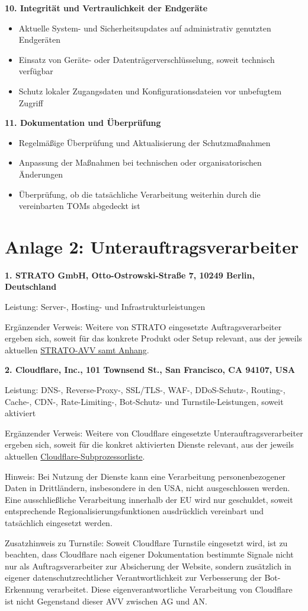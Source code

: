 \documentclass[11pt,a4paper]{article}
\begin{document}
\textbf{10. Integrität und Vertraulichkeit der Endgeräte}
\begin{itemize}
  \item Aktuelle System- und Sicherheitsupdates auf administrativ genutzten Endgeräten
  \item Einsatz von Geräte- oder Datenträgerverschlüsselung, soweit technisch verfügbar
  \item Schutz lokaler Zugangsdaten und Konfigurationsdateien vor unbefugtem Zugriff
\end{itemize}

\textbf{11. Dokumentation und Überprüfung}
\begin{itemize}
  \item Regelmäßige Überprüfung und Aktualisierung der Schutzmaßnahmen
  \item Anpassung der Maßnahmen bei technischen oder organisatorischen Änderungen
  \item Überprüfung, ob die tatsächliche Verarbeitung weiterhin durch die vereinbarten TOMs abgedeckt ist
\end{itemize}

\section*{Anlage 2: Unterauftragsverarbeiter}
\textbf{1. STRATO GmbH, Otto-Ostrowski-Straße 7, 10249 Berlin, Deutschland}\par
Leistung: Server-, Hosting- und Infrastrukturleistungen\par
Ergänzender Verweis: Weitere von STRATO eingesetzte Auftragsverarbeiter ergeben sich, soweit für das konkrete Produkt oder Setup relevant, aus der jeweils aktuellen \href{https://www.strato.de/agb/avv/}{STRATO-AVV samt Anhang}.

\textbf{2. Cloudflare, Inc., 101 Townsend St., San Francisco, CA 94107, USA}\par
Leistung: DNS-, Reverse-Proxy-, SSL/TLS-, WAF-, DDoS-Schutz-, Routing-, Cache-, CDN-, Rate-Limiting-, Bot-Schutz- und Turnstile-Leistungen, soweit aktiviert\par
Ergänzender Verweis: Weitere von Cloudflare eingesetzte Unterauftragsverarbeiter ergeben sich, soweit für die konkret aktivierten Dienste relevant, aus der jeweils aktuellen \href{https://www.cloudflare.com/gdpr/subprocessors/cloudflare-services/}{Cloudflare-Sub\-pro\-zes\-sor\-liste}.\par
Hinweis: Bei Nutzung der Dienste kann eine Verarbeitung personenbezogener Daten in Drittländern, insbesondere in den USA, nicht ausgeschlossen werden. Eine ausschließliche Verarbeitung innerhalb der EU wird nur geschuldet, soweit entsprechende Regionalisierungsfunktionen ausdrücklich vereinbart und tatsächlich eingesetzt werden.\par
Zusatzhinweis zu Turnstile: Soweit Cloudflare Turnstile eingesetzt wird, ist zu beachten, dass Cloudflare nach eigener Dokumentation bestimmte Signale nicht nur als Auftragsverarbeiter zur Absicherung der Website, sondern zusätzlich in eigener datenschutzrechtlicher Verantwortlichkeit zur Verbesserung der Bot-Erkennung verarbeitet. Diese eigenverantwortliche Verarbeitung von Cloudflare ist nicht Gegenstand dieser AVV zwischen AG und AN.
\end{document}
